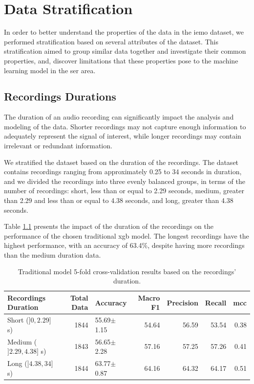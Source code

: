 \chapter{Data Stratification}
\label{chapter:data_stratification}


In order to better understand the properties of the data in the \ac{iemo} dataset, we performed stratification based on several attributes of the dataset. This stratification aimed to group similar data together and investigate their common properties, and, discover limitations that these properties pose to the machine learning model in the \ac{ser} area.

\section{Recordings Durations}

The duration of an audio recording can significantly impact the analysis and modeling of the data. Shorter recordings may not capture enough information to adequately represent the signal of interest, while longer recordings may contain irrelevant or redundant information.

We stratified the dataset based on the duration of the recordings. The dataset contains recordings ranging from approximately 0.25 to 34 seconds in duration, and we divided the recordings into three evenly balanced groups, in terms of the number of recordings: short, less than or equal to  2.29 seconds, medium, greater than 2.29 and less than or equal to 4.38 seconds, and long, greater than 4.38 seconds.

Table \ref{5:durations} presents the impact of the duration of the recordings on the performance of the chosen traditional \ac{xgb} model. The longest recordings have the highest performance, with an accuracy of 63.4\%, despite having more recordings than the medium duration data. 

\begin{table}[H]
	\centering
	\caption{Traditional model 5-fold cross-validation results based on the recordings' duration.}
	\label{5:durations}
	\begin{tabular}{lrlrrrr}
		\toprule
		Recordings Duration &   Total Data & Accuracy    &   Macro F1 &   Precision &   Recall &   \ac{mcc} \\
		\midrule
		Short ($]0, 2.29]$ s)	 	&      1844 & 55.69$\pm$1.15 &   54.64 &  56.59 &  53.54 &  0.38  \\
		Medium ($]2.29, 4.38]$ s) 	&      1843 & 56.65$\pm$2.28 &   57.16 &  57.25 &  57.26 &  0.41 \\
		Long ($]4.38, 34]$ s) 		&      1844 & 63.77$\pm$0.87 &   64.16 &  64.32 &  64.17 &  0.51  \\	
		\bottomrule
	\end{tabular}
\end{table}

